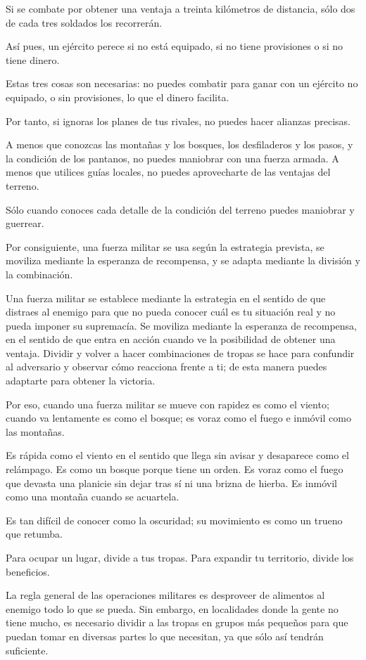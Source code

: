 Si se combate por obtener una ventaja a treinta kilómetros de distancia, sólo dos de cada tres soldados los recorrerán.

Así pues, un ejército perece si no está equipado, si no tiene provisiones o si no tiene dinero.

Estas tres cosas son necesarias: no puedes combatir para ganar con un ejército no equipado, o sin provisiones, lo que el dinero facilita.

Por tanto, si ignoras los planes de tus rivales, no puedes hacer alianzas precisas.

A menos que conozcas las montañas y los bosques, los desfiladeros y los pasos, y la condición de los pantanos, no puedes maniobrar con una fuerza armada. A menos que utilices guías locales, no puedes aprovecharte de las ventajas del terreno.

Sólo cuando conoces cada detalle de la condición del terreno puedes maniobrar y guerrear.

Por consiguiente, una fuerza militar se usa según la estrategia prevista, se moviliza mediante la esperanza de recompensa, y se adapta mediante la división y la combinación.

Una fuerza militar se establece mediante la estrategia en el sentido de que distraes al enemigo para que no pueda conocer cuál es tu situación real y no pueda imponer su supremacía. Se moviliza mediante la esperanza de recompensa, en el sentido de que entra en acción cuando ve la posibilidad de obtener una ventaja. Dividir y volver a hacer combinaciones de tropas se hace para confundir al adversario y observar cómo reacciona frente a ti; de esta manera puedes adaptarte para obtener la victoria.

Por eso, cuando una fuerza militar se mueve con rapidez es como el viento; cuando va lentamente es como el bosque; es voraz como el fuego e inmóvil como las montañas.

Es rápida como el viento en el sentido que llega sin avisar y desaparece como el relámpago. Es como un bosque porque tiene un orden. Es voraz como el fuego que devasta una planicie sin dejar tras sí ni una brizna de hierba. Es inmóvil como una montaña cuando se acuartela.

Es tan difícil de conocer como la oscuridad; su movimiento es como un trueno que retumba.

Para ocupar un lugar, divide a tus tropas. Para expandir tu territorio, divide los beneficios.

La regla general de las operaciones militares es desproveer de alimentos al enemigo todo lo que se pueda. Sin embargo, en localidades donde la gente no tiene mucho, es necesario dividir a las tropas en grupos más pequeños para que puedan tomar en diversas partes lo que necesitan, ya que sólo así tendrán suficiente.

